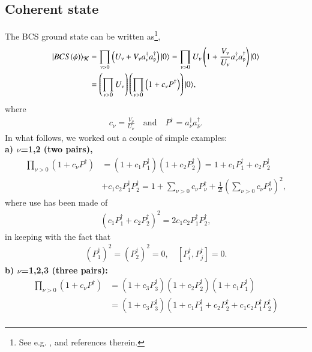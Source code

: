 \begin{subappendices} 
\section[Coherent state]{Coherent state}\label{App3E}
The BCS ground state can be written as\footnote{See e.g. \cite{Potel:13b}, and references therein.},
\begin{align}\label{eq1App3Ex} 
\nonumber |{BCS(\phi)} \rangle_{\mathcal K}&=\prod_{\nu>0}\left(U_\nu+V_\nu a_\nu^\dagger a_{\bar{\nu}}^\dagger\right)|{0} \rangle=\prod_{\nu>0}U_\nu\left(1+\frac{V_\nu}{U_\nu} a_\nu^\dagger a_{\bar{\nu}}^\dagger\right)|{0} \rangle\\
&=\left(\prod_{\nu>0}U_\nu\right)\left(\prod_{\nu>0}\left(1+c_\nu P^\dagger\right)\right)|{0} \rangle,
\end{align}
where
\begin{align}\label{eq2App3Ex} 
 c_\nu=\frac{V_\nu}{U_\nu}\quad\text{and}\quad P^\dagger=a_\nu^\dagger a_{\bar{\nu}}^\dagger.
\end{align}
In what follows, we worked out a couple of simple examples:\\
\textbf{a) $\nu$=1,2 (two pairs),}
\begin{align}\label{eq2App4Ex} 
 \nonumber \prod_{\nu>0}\left(1+c_\nu P^\dagger\right)&=\left(1+c_1P_1^\dagger\right)\left(1+c_2P_2^\dagger\right)=1+c_1P_1^\dagger+c_2P_2^\dagger\\
 &+c_1c_2P_1^\dagger P_2^\dagger=1+\sum_{\nu>0}c_\nu P_\nu^\dagger + \frac{1}{2!}\left(\sum_{\nu>0}c_\nu P^\dagger_\nu\right)^2,
\end{align}
where use has been made of
\begin{align}\label{eq2App5Ex} 
\left(c_1P_1^\dagger+ c_2P_2^\dagger\right)^2=2c_1c_2P_1^\dagger P_2^\dagger,
\end{align}
in keeping with  the fact that
\begin{align}\label{eq2App6Ex}
\left(P_1^\dagger\right)^2=\left(P_2^\dagger\right)^2=0,\quad \left[P_i^\dagger,P_j^\dagger\right]=0.
\end{align}
\textbf{b) $\nu$=1,2,3 (three pairs):}
\begin{align}\label{eq2App7Ex}
\nonumber \prod_{\nu>0}\left(1+c_\nu P^\dagger\right)&=\left(1+c_3P_3^\dagger\right)\left(1+c_2P_2^\dagger\right)\left(1+c_1P_1^\dagger\right)\\
\nonumber &=\left(1+c_3P_3^\dagger\right)\left(1+c_1P_1^\dagger+c_2P_2^\dagger+c_1c_2P_1^\dagger P_2^\dagger\right)\\

\end{align}
\end{subappendices}
